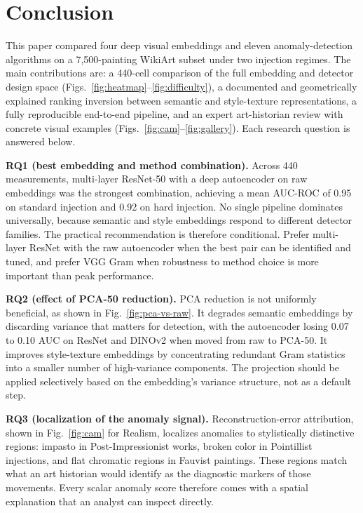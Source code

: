 \documentclass[conference]{IEEEtran}
\begin{document}
\section{Conclusion}
\label{sec:conclusion}

This paper compared four deep visual embeddings and eleven anomaly-detection algorithms on a 7{,}500-painting WikiArt subset under two injection regimes. The main contributions are: a 440-cell comparison of the full embedding and detector design space (Figs.~\ref{fig:heatmap}--\ref{fig:difficulty}), a documented and geometrically explained ranking inversion between semantic and style-texture representations, a fully reproducible end-to-end pipeline, and an expert art-historian review with concrete visual examples (Figs.~\ref{fig:cam}--\ref{fig:gallery}). Each research question is answered below.

\textbf{RQ1 (best embedding and method combination).} Across 440
measurements, multi-layer ResNet-50 with a deep autoencoder on raw embeddings was the strongest combination, achieving a mean AUC-ROC of 0.95 on standard injection and 0.92 on hard injection. No single pipeline dominates universally, because semantic and style embeddings respond to different detector families. The practical recommendation is therefore conditional. Prefer multi-layer ResNet with the raw autoencoder when the best pair can be identified and tuned, and prefer VGG Gram when robustness to method choice is more important than peak performance.

\textbf{RQ2 (effect of PCA-50 reduction).} PCA reduction is not
uniformly beneficial, as shown in Fig.~\ref{fig:pca-vs-raw}. It degrades semantic embeddings by discarding variance that matters for detection, with the autoencoder losing 0.07 to 0.10 AUC on ResNet and DINOv2 when moved from raw to PCA-50. It improves style-texture embeddings by concentrating redundant Gram statistics into a smaller number of high-variance components. The projection should be applied selectively based on the embedding's variance structure, not as a default step.

\textbf{RQ3 (localization of the anomaly signal).}
Reconstruction-error attribution, shown in Fig.~\ref{fig:cam} for Realism, localizes anomalies to stylistically distinctive regions: impasto in Post-Impressionist works, broken color in Pointillist injections, and flat chromatic regions in Fauvist paintings. These regions match what an art historian would identify as the diagnostic markers of those movements. Every scalar anomaly score therefore comes with a spatial explanation that an analyst can inspect directly.
\end{document}
